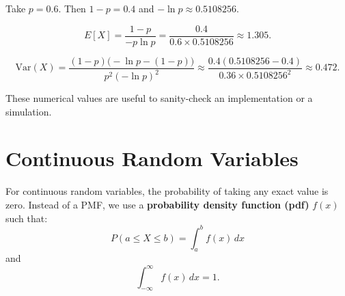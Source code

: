 \documentclass[12pt]{article}
\begin{document}
Take \(p=0.6\). Then \(1-p=0.4\) and \(-\ln p\approx 0.5108256\).

\[
E[X]=\frac{1-p}{-p\ln p}=\frac{0.4}{0.6\times 0.5108256}\approx 1.305.
\]

\[
\mathrm{Var}(X)=\frac{(1-p)\big(-\ln p-(1-p)\big)}{p^2(-\ln p)^2}
\approx \frac{0.4(0.5108256-0.4)}{0.36\times 0.5108256^2}\approx 0.472.
\]

These numerical values are useful to sanity-check an implementation or a simulation.



\section{Continuous Random Variables}

For continuous random variables, the probability of taking any exact value is zero.  
Instead of a PMF, we use a \textbf{probability density function (pdf)} \( f(x) \) such that:
\[
P(a \leq X \leq b) = \int_{a}^{b} f(x) \, dx
\]
and
\[
\int_{-\infty}^{\infty} f(x) \, dx = 1.
\]
\end{document}
